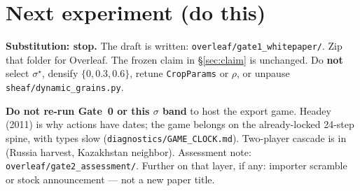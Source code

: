 \section{Next experiment (do this)}
\label{sec:next}

\textbf{Substitution: stop.} The draft is written:
\texttt{overleaf/gate1\_whitepaper/}. Zip that folder for Overleaf.
The frozen claim in \S\ref{sec:claim} is unchanged. Do \textbf{not}
select \(\sigma^\star\), densify \(\{0,0.3,0.6\}\), retune
\texttt{CropParams} or \(\rho\), or unpause
\texttt{sheaf/dynamic\_grains.py}.

\textbf{Do not re-run Gate~0 or this $\sigma$ band} to host the export
game. Headey (2011) is why actions have dates; the game belongs on the
already-locked 24-step spine, with types slow
(\texttt{diagnostics/GAME\_CLOCK.md}). Two-player cascade is in
(Russia harvest, Kazakhstan neighbor). Assessment note:
\texttt{overleaf/gate2\_assessment/}. Further on that layer, if any:
importer scramble or stock announcement --- not a new paper title.
